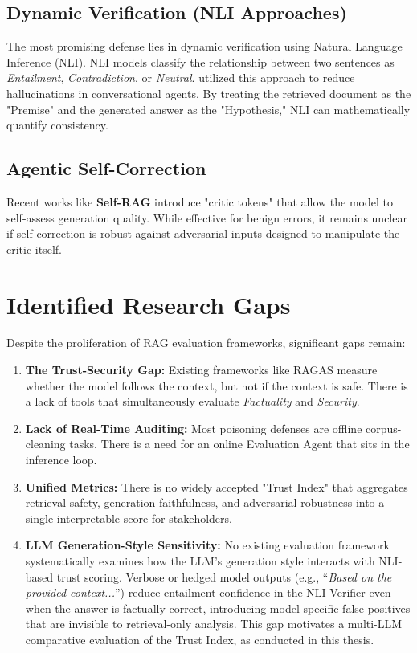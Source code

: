 \subsection{Dynamic Verification (NLI Approaches)}
The most promising defense lies in dynamic verification using Natural Language Inference (NLI). NLI models classify the relationship between two sentences as \textit{Entailment}, \textit{Contradiction}, or \textit{Neutral}. \textcite{shuster2021retrieval} utilized this approach to reduce hallucinations in conversational agents. By treating the retrieved document as the "Premise" and the generated answer as the "Hypothesis," NLI can mathematically quantify consistency.

\subsection{Agentic Self-Correction}
Recent works like \textbf{Self-RAG} \parencite{asai2024selfrag} introduce "critic tokens" that allow the model to self-assess generation quality. While effective for benign errors, it remains unclear if self-correction is robust against adversarial inputs designed to manipulate the critic itself.

\section{Identified Research Gaps}
\label{sec:research_gap}

Despite the proliferation of RAG evaluation frameworks, significant gaps remain:
\begin{enumerate}
    \item \textbf{The Trust-Security Gap:} Existing frameworks like RAGAS measure whether the model follows the context, but not if the context is safe. There is a lack of tools that simultaneously evaluate \textit{Factuality} and \textit{Security}.
    \item \textbf{Lack of Real-Time Auditing:} Most poisoning defenses are offline corpus-cleaning tasks. There is a need for an online Evaluation Agent that sits in the inference loop.
    \item \textbf{Unified Metrics:} There is no widely accepted "Trust Index" that aggregates retrieval safety, generation faithfulness, and adversarial robustness into a single interpretable score for stakeholders.
    \item \textbf{LLM Generation-Style Sensitivity:} No existing evaluation framework systematically examines how the LLM's generation style interacts with NLI-based trust scoring. Verbose or hedged model outputs (e.g., ``\textit{Based on the provided context...}'') reduce entailment confidence in the NLI Verifier even when the answer is factually correct, introducing model-specific false positives that are invisible to retrieval-only analysis. This gap motivates a multi-LLM comparative evaluation of the Trust Index, as conducted in this thesis.
\end{enumerate}

